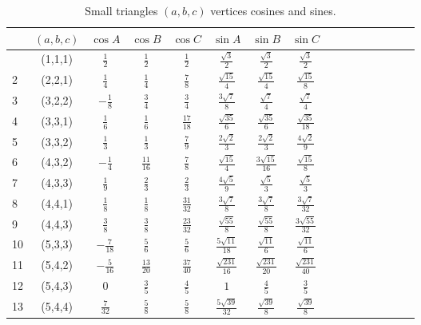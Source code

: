 \documentclass[11pt]{article}
\begin{document}
\begin{longtable}{ | p{1cm}| *{15}{c|} }
\caption{Small triangles $(a,b,c)$ vertices cosines and sines.}\\
\hline
  & $(a,b,c)$ & $\cos{A}$ & $\cos{B}$ & $\cos{C}$ & $\sin{A}$ & $\sin{B}$ & $\sin{C}$\\
\hline\endhead
\hline\endfoot
1 & (1,1,1) & $\frac{1}{2}$ & $\frac{1}{2}$ & $\frac{1}{2}$ & $\frac{\sqrt{3}}{2}$ & $\frac{\sqrt{3}}{2}$ & $\frac{\sqrt{3}}{2}$\\
2 & (2,2,1) & $\frac{1}{4}$ & $\frac{1}{4}$ & $\frac{7}{8}$ & $\frac{\sqrt{15}}{4}$ & $\frac{\sqrt{15}}{4}$ & $\frac{\sqrt{15}}{8}$\\
3 & (3,2,2) & $-\frac{1}{8}$ & $\frac{3}{4}$ & $\frac{3}{4}$ & $\frac{3\sqrt{7}}{8}$ & $\frac{\sqrt{7}}{4}$ & $\frac{\sqrt{7}}{4}$\\
4 & (3,3,1) & $\frac{1}{6}$ & $\frac{1}{6}$ & $\frac{17}{18}$ & $\frac{\sqrt{35}}{6}$ & $\frac{\sqrt{35}}{6}$ & $\frac{\sqrt{35}}{18}$\\
5 & (3,3,2) & $\frac{1}{3}$ & $\frac{1}{3}$ & $\frac{7}{9}$ & $\frac{2\sqrt{2}}{3}$ & $\frac{2\sqrt{2}}{3}$ & $\frac{4\sqrt{2}}{9}$\\
6 & (4,3,2) & $-\frac{1}{4}$ & $\frac{11}{16}$ & $\frac{7}{8}$ & $\frac{\sqrt{15}}{4}$ & $\frac{3\sqrt{15}}{16}$ & $\frac{\sqrt{15}}{8}$\\
7 & (4,3,3) & $\frac{1}{9}$ & $\frac{2}{3}$ & $\frac{2}{3}$ & $\frac{4\sqrt{5}}{9}$ & $\frac{\sqrt{5}}{3}$ & $\frac{\sqrt{5}}{3}$\\
8 & (4,4,1) & $\frac{1}{8}$ & $\frac{1}{8}$ & $\frac{31}{32}$ & $\frac{3\sqrt{7}}{8}$ & $\frac{3\sqrt{7}}{8}$ & $\frac{3\sqrt{7}}{32}$\\
9 & (4,4,3) & $\frac{3}{8}$ & $\frac{3}{8}$ & $\frac{23}{32}$ & $\frac{\sqrt{55}}{8}$ & $\frac{\sqrt{55}}{8}$ & $\frac{3\sqrt{55}}{32}$\\
10 & (5,3,3) & $-\frac{7}{18}$ & $\frac{5}{6}$ & $\frac{5}{6}$ & $\frac{5\sqrt{11}}{18}$ & $\frac{\sqrt{11}}{6}$ & $\frac{\sqrt{11}}{6}$\\
11 & (5,4,2) & $-\frac{5}{16}$ & $\frac{13}{20}$ & $\frac{37}{40}$ & $\frac{\sqrt{231}}{16}$ & $\frac{\sqrt{231}}{20}$ & $\frac{\sqrt{231}}{40}$\\
12 & (5,4,3) & $0$ & $\frac{3}{5}$ & $\frac{4}{5}$ & $1$ & $\frac{4}{5}$ & $\frac{3}{5}$\\
13 & (5,4,4) & $\frac{7}{32}$ & $\frac{5}{8}$ & $\frac{5}{8}$ & $\frac{5\sqrt{39}}{32}$ & $\frac{\sqrt{39}}{8}$ & $\frac{\sqrt{39}}{8}$\\

\end{longtable}
\end{document}
